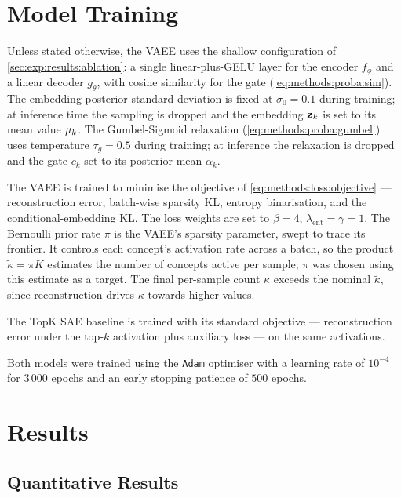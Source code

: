 \section{Model Training} \label{sec:exp:training}

Unless stated otherwise, the \ac{VAEE} uses the shallow configuration of
\cref{sec:exp:results:ablation}: a single
linear-plus-\acs{GELU} layer for the encoder $f_\phi$ and a linear decoder
$g_\theta$, with cosine similarity for the gate
(\cref{eq:methods:proba:sim}). The embedding posterior
standard deviation is fixed at $\sigma_0 = 0.1$ during training; at inference
time the sampling is dropped and the embedding $\vb{z}_{k}$ is set to its mean
value $\vb{\mu}_{k}$. The Gumbel-Sigmoid relaxation
(\cref{eq:methods:proba:gumbel}) uses temperature $\tau_g =
0.5$ during training; at inference the relaxation is dropped and the gate
$c_{k}$ set to its posterior mean $\alpha_{k}$.

The \ac{VAEE} is trained to minimise the objective of
\cref{eq:methods:loss:objective} --- reconstruction error,
batch-wise sparsity \ac{KL}, entropy binarisation, and the conditional-embedding
\ac{KL}. The loss weights are set to $\beta = 4$, $\lambda_{\mathrm{ent}} =
\gamma = 1$. The Bernoulli prior rate $\pi$ is the \ac{VAEE}'s sparsity
parameter, swept to trace its frontier. It controls each concept's activation
rate across a batch, so the product $\tilde{\kappa} = \pi K$ estimates the
number of concepts active per sample; $\pi$ was chosen using this estimate as a
target. The final per-sample count $\kappa$ exceeds the nominal
$\tilde{\kappa}$, since reconstruction drives $\kappa$ towards higher values.

The TopK \ac{SAE} baseline is trained with its standard objective ---
reconstruction error under the top-$k$ activation plus auxiliary loss --- on the
same activations.

Both models were trained using the \texttt{Adam} optimiser
\cite{kingmaAdamMethodStochastic2017} with a learning rate of $10^{-4}$ for
$3\,000$ epochs and an early stopping patience of $500$ epochs.

\section{Results} \label{sec:exp:results}

\subsection{Quantitative Results} \label{sec:exp:results:quant}

